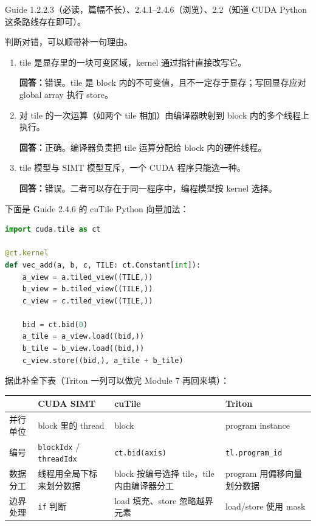 \documentclass[11pt,a4paper,fontset=windows]{ctexart}
\begin{document}
\begin{reading}
Guide 1.2.2.3（必读，篇幅不长）、2.4.1--2.4.6（浏览）、2.2（知道 CUDA Python 这条路线存在即可）。
\end{reading}

判断对错，可以顺带补一句理由。
\begin{enumerate}[label=(\alph*)]
  \item tile 是显存里的一块可变区域，kernel 通过指针直接改写它。
  \par\textbf{回答：}错误。tile 是 block 内的不可变值，且不一定存于显存；写回显存应对 global array 执行 store。
  \item 对 tile 的一次运算（如两个 tile 相加）由编译器映射到 block 内的多个线程上执行。
  \par\textbf{回答：}正确。编译器负责把 tile 运算分配给 block 内的硬件线程。
  \item tile 模型与 SIMT 模型互斥，一个 CUDA 程序只能选一种。
  \par\textbf{回答：}错误。二者可以存在于同一程序中，编程模型按 kernel 选择。
\end{enumerate}

下面是 Guide 2.4.6 的 cuTile Python 向量加法：

\begin{lstlisting}[language=Python]
import cuda.tile as ct

@ct.kernel
def vec_add(a, b, c, TILE: ct.Constant[int]):
    a_view = a.tiled_view((TILE,))
    b_view = b.tiled_view((TILE,))
    c_view = c.tiled_view((TILE,))

    bid = ct.bid(0)
    a_tile = a_view.load((bid,))
    b_tile = b_view.load((bid,))
    c_view.store((bid,), a_tile + b_tile)
\end{lstlisting}

据此补全下表（Triton 一列可以做完 Module 7 再回来填）：

\begin{center}\small
\begin{tabular}{@{}lp{8em}p{9em}p{9em}@{}}
\toprule
 & CUDA SIMT & cuTile & Triton \\
\midrule
并行单位 & block 里的 thread & block & program instance \\
编号 & \texttt{blockIdx} / \texttt{threadIdx} & \texttt{ct.bid(axis)} & \texttt{tl.program\_id} \\
数据分工 & 线程用全局下标来划分数据 & block 按编号选择 tile，tile 内由编译器分工 & program 用偏移向量划分数据 \\
边界处理 & \texttt{if} 判断 & load 填充、store 忽略越界元素 & load/store 使用 mask \\
\bottomrule
\end{tabular}
\end{center}
\end{document}
